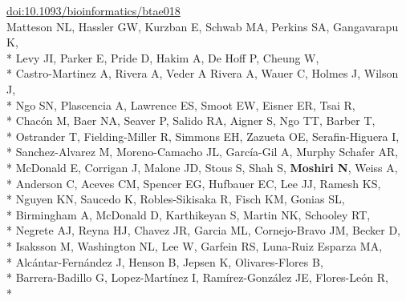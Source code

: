 \documentclass[margin,line]{res}
\begin{document}
\begin{resume}
\hspace*{8mm} \href{https://doi.org/10.1093/bioinformatics/btae018}{doi:10.1093/bioinformatics/btae018}\\
\hspace*{4mm} Matteson NL, Hassler GW, Kurzban E, Schwab MA, Perkins SA, Gangavarapu K,\\*
\hspace*{9.5mm} Levy JI, Parker E, Pride D, Hakim A, De Hoff P, Cheung W,\\*
\hspace*{9.5mm} Castro-Martinez A, Rivera A, Veder A Rivera A, Wauer C, Holmes J, Wilson J,\\*
\hspace*{9.5mm} Ngo SN, Plascencia A, Lawrence ES, Smoot EW, Eisner ER, Tsai R,\\*
\hspace*{9.5mm} Chac\'{o}n M, Baer NA, Seaver P, Salido RA, Aigner S, Ngo TT, Barber T,\\*
\hspace*{9.5mm} Ostrander T, Fielding-Miller R, Simmons EH, Zazueta OE, Serafin-Higuera I,\\*
\hspace*{9.5mm} Sanchez-Alvarez M, Moreno-Camacho JL, García-Gil A, Murphy Schafer AR,\\*
\hspace*{9.5mm} McDonald E, Corrigan J, Malone JD, Stous S, Shah S, \textbf{Moshiri N}, Weiss A,\\*
\hspace*{9.5mm} Anderson C, Aceves CM, Spencer EG, Hufbauer EC, Lee JJ, Ramesh KS,\\*
\hspace*{9.5mm} Nguyen KN, Saucedo K, Robles-Sikisaka R, Fisch KM, Gonias SL,\\*
\hspace*{9.5mm} Birmingham A, McDonald D, Karthikeyan S, Martin NK, Schooley RT,\\*
\hspace*{9.5mm} Negrete AJ, Reyna HJ, Chavez JR, Garcia ML, Cornejo-Bravo JM, Becker D,\\*
\hspace*{9.5mm} Isaksson M, Washington NL, Lee W, Garfein RS, Luna-Ruiz Esparza MA,\\*
\hspace*{9.5mm} Alc\'{a}ntar-Fern\'{a}ndez J, Henson B, Jepsen K, Olivares-Flores B,\\*
\hspace*{9.5mm} Barrera-Badillo G, Lopez-Mart\'{i}nez I, Ram\'{i}rez-Gonz\'{a}lez JE, Flores-Le\'{o}n R,\\*

\end{resume}
\end{document}

